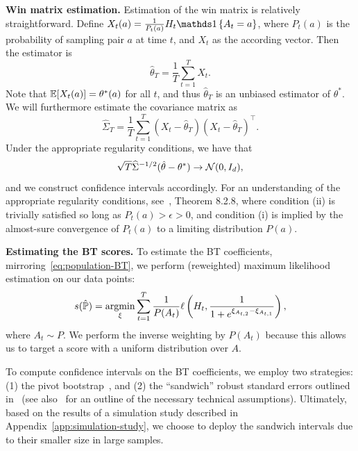 \documentclass{article}
\begin{document}
\textbf{Win matrix estimation.} Estimation of the win matrix is relatively straightforward. Define $X_t(a) = \frac{1}{P_t(a)} H_t \ind{A_t = a}$, where $P_t(a)$ is the probability of sampling pair $a$ at time $t$, and $X_t$ as the according vector.
Then the estimator is
\begin{equation}
    \label{eq:reweighted-standard-estimator}
    \hat{\theta}_T = \frac{1}{T}\sum\limits_{t=1}^TX_t.
\end{equation}
Note that $\mathbb{E}[X_t(a)] = \theta^*(a)$ for all $t$, and thus $\hat{\theta}_T$ is an unbiased estimator of $\theta^*$.
We will furthermore estimate the covariance matrix as
\begin{equation}
    \label{eq:reweighted-covariance_matrix}
    \widehat{\Sigma}_T = \frac{1}{T}\sum\limits_{t=1}^T (X_t - \hat{\theta}_T)(X_t - \hat{\theta}_T)^\top.
\end{equation}
Under the appropriate regularity conditions, we have that
\begin{equation}
    \sqrt{T}\widehat{\Sigma}^{-1/2}(\hat{\theta} - \theta^*) \to \mathcal{N}(0, I_d),
\end{equation}
and we construct confidence intervals accordingly.
For an understanding of the appropriate regularity conditions, see~\citet{durrett2019probability}, Theorem 8.2.8, where condition (ii) is trivially satisfied so long as $P_t(a) > \epsilon > 0$, and condition (i) is implied by the almost-sure convergence of $P_t(a)$ to a limiting distribution $P(a)$.

\textbf{Estimating the BT scores.}
To estimate the BT coefficients, mirroring~\eqref{eq:population-BT}, we perform (reweighted) maximum likelihood estimation on our data points:
\begin{equation}
    \label{eq:empirical-BT}
    s(\hat{\mathbb{P}}) = \operatorname*{argmin}_{\xi} \sum\limits_{t=1}^T \frac{1}{P(A_t)}\ell\left(H_t, \frac{1}{1+e^{\xi_{A_{t,2}}-\xi_{A_{t,1}}}}\right),
\end{equation}
where $A_t \sim P$.
We perform the inverse weighting by $P(A_t)$ because this allows us to target a score with a uniform distribution over $A$.

To compute confidence intervals on the BT coefficients, we employ two strategies: (1) the pivot bootstrap~\cite{diciccio1996bootstrap}, and (2) the ``sandwich'' robust standard errors outlined in~\citet{huber1967behavior} (see also~\citet{freedman2006so} for an outline of the necessary technical assumptions).
Ultimately, based on the results of a simulation study described in Appendix~\ref{app:simulation-study}, we choose to deploy the sandwich intervals due to their smaller size in large samples.
\end{document}
